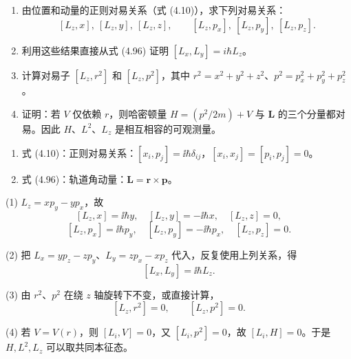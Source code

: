 \begin{question}
\begin{enumerate}
\item 由位置和动量的正则对易关系（式 (4.10)），求下列对易关系：
\[
[L_z,x],\ [L_z,y],\ [L_z,z],\qquad
[L_z,p_x],\ [L_z,p_y],\ [L_z,p_z].
\]
\item 利用这些结果直接从式 (4.96) 证明 $[L_x,L_y]=i\hbar L_z$。
\item 计算对易子 $[L_z,r^2]$ 和 $[L_z,p^2]$，其中 $r^2=x^2+y^2+z^2$、$p^2=p_x^2+p_y^2+p_z^2$。
\item 证明：若 $V$ 仅依赖 $r$，则哈密顿量 $H=(p^2/2m)+V$ 与 $\mathbf L$ 的三个分量都对易。因此 $H$、$L^2$、$L_z$ 是相互相容的可观测量。
\end{enumerate}

\par\smallskip
{}
\begin{enumerate}[leftmargin=2.2em,itemsep=0.12em,topsep=0.12em,parsep=0pt]
\item 式 (4.10)：正则对易关系：$[x_i,p_j]=\ii\hbar\delta_{ij}$，$[x_i,x_j]=[p_i,p_j]=0$。
\item 式 (4.96)：轨道角动量：$\mathbf L=\mathbf r\times\mathbf p$。
\end{enumerate}

\end{question}
\begin{solution}

(1) $L_z=xp_y-yp_x$，故
\[
[L_z,x]=\ii\hbar y,
\quad [L_z,y]=-\ii\hbar x,
\quad [L_z,z]=0,
\]
\[
[L_z,p_x]=\ii\hbar p_y,
\quad [L_z,p_y]=-\ii\hbar p_x,
\quad [L_z,p_z]=0.
\]

(2) 把 $L_x=yp_z-zp_y$、$L_y=zp_x-xp_z$ 代入，反复使用上列关系，得
\[
[L_x,L_y]=\ii\hbar L_z.
\]

(3) 由 $r^2$、$p^2$ 在绕 $z$ 轴旋转下不变，或直接计算，
\[
[L_z,r^2]=0,
\qquad [L_z,p^2]=0.
\]

(4) 若 $V=V(r)$，则 $[L_i,V]=0$，又 $[L_i,p^2]=0$，故 $[L_i,H]=0$。于是 $H,L^2,L_z$ 可以取共同本征态。

\end{solution}

